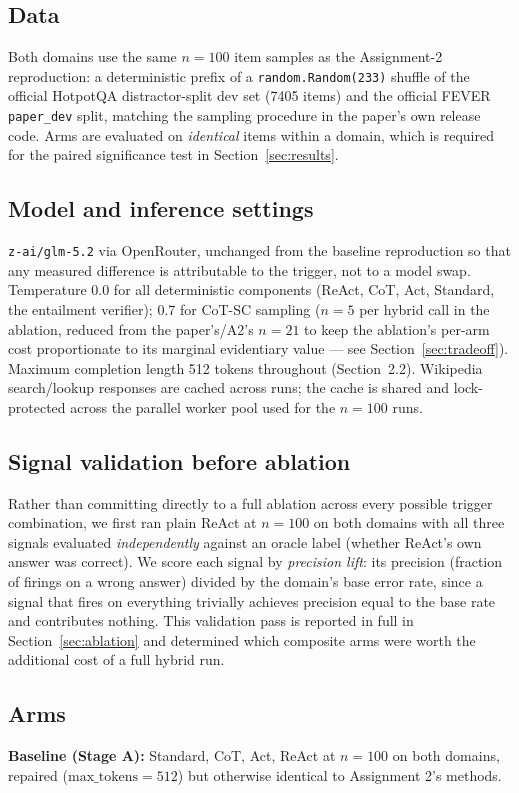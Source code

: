 \subsection{Data}
Both domains use the same $n{=}100$ item samples as the Assignment-2
reproduction: a deterministic prefix of a \texttt{random.Random(233)}
shuffle of the official HotpotQA distractor-split dev set (7405 items) and
the official FEVER \texttt{paper\_dev} split, matching the sampling
procedure in the paper's own release code. Arms are evaluated on
\emph{identical} items within a domain, which is required for the paired
significance test in Section~\ref{sec:results}.

\subsection{Model and inference settings}
\texttt{z-ai/glm-5.2} via OpenRouter, unchanged from the baseline
reproduction so that any measured difference is attributable to the
trigger, not to a model swap. Temperature 0.0 for all deterministic
components (ReAct, CoT, Act, Standard, the entailment verifier); 0.7 for
CoT-SC sampling ($n{=}5$ per hybrid call in the ablation, reduced from the
paper's/A2's $n{=}21$ to keep the ablation's per-arm cost proportionate to
its marginal evidentiary value --- see Section~\ref{sec:tradeoff}).
Maximum completion length 512 tokens throughout (Section~2.2).
Wikipedia search/lookup responses are cached across runs; the cache is
shared and lock-protected across the parallel worker pool used for the
$n{=}100$ runs.

\subsection{Signal validation before ablation}
Rather than committing directly to a full ablation across every possible
trigger combination, we first ran plain ReAct at $n{=}100$ on both domains
with all three signals evaluated \emph{independently} against an oracle
label (whether ReAct's own answer was correct). We score each signal by
\emph{precision lift}: its precision (fraction of firings on a wrong
answer) divided by the domain's base error rate, since a signal that
fires on everything trivially achieves precision equal to the base rate
and contributes nothing. This validation pass is reported in full in
Section~\ref{sec:ablation} and determined which composite arms were worth
the additional cost of a full hybrid run.

\subsection{Arms}
\textbf{Baseline (Stage A):} Standard, CoT, Act, ReAct at $n{=}100$ on both
domains, repaired ($\mathrm{max\_tokens}{=}512$) but otherwise identical
to Assignment 2's methods.

